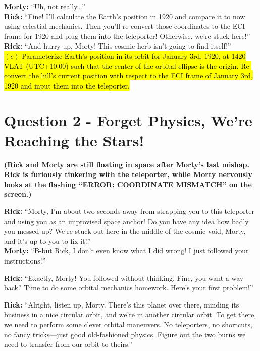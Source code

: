 \documentclass[a4paper, 12pt]{exam}
\begin{document}
\noindent \textbf{Morty:} “Uh, not really...” \\

\noindent \textbf{Rick:} “Fine! I’ll calculate the Earth’s position in 1920 and compare it to now using celestial mechanics. Then you’ll re-convert those coordinates to the ECI frame for 1920 and plug them into the teleporter! Otherwise, we’re stuck here!” \\

\noindent \textbf{Rick:} “And hurry up, Morty! This cosmic herb isn’t going to find itself!” \\

\hl{$(c)$ Parameterize Earth's position in its orbit for January 3rd, 1920, at 1420 VLAT (UTC+10:00) such that the center of the orbital ellipse is the origin. Re-convert the hill's current position with respect to the ECI frame of January 3rd, 1920 and input them into the teleporter.}

	\pagebreak
	
	\section*{Question 2 - Forget Physics, We’re Reaching the Stars!}

\noindent \textbf{(Rick and Morty are still floating in space after Morty’s last mishap. Rick is furiously tinkering with the teleporter, while Morty nervously looks at the flashing “ERROR: COORDINATE MISMATCH” on the screen.)}

\bigskip
\noindent \textbf{Rick:} “Morty, I’m about two seconds away from strapping you to this teleporter and using you as an improvised space anchor! Do you have any idea how badly you messed up? We’re stuck out here in the middle of the cosmic void, Morty, and it’s up to you to fix it!” \\

\noindent \textbf{Morty:} “B-but Rick, I don’t even know what I did wrong! I just followed your instructions!” \bigskip

\noindent \textbf{Rick:} “Exactly, Morty! You followed without thinking. Fine, you want a way back? Time to do some orbital mechanics homework. Here’s your first problem!”

\bigskip

\noindent \textbf{Rick:} “Alright, listen up, Morty. There’s this planet over there, minding its business in a nice circular orbit, and we’re in another circular orbit. To get there, we need to perform some clever orbital maneuvers. No teleporters, no shortcuts, no fancy tricks—just good old-fashioned physics. Figure out the two burns we need to transfer from our orbit to theirs.”
\end{document}
